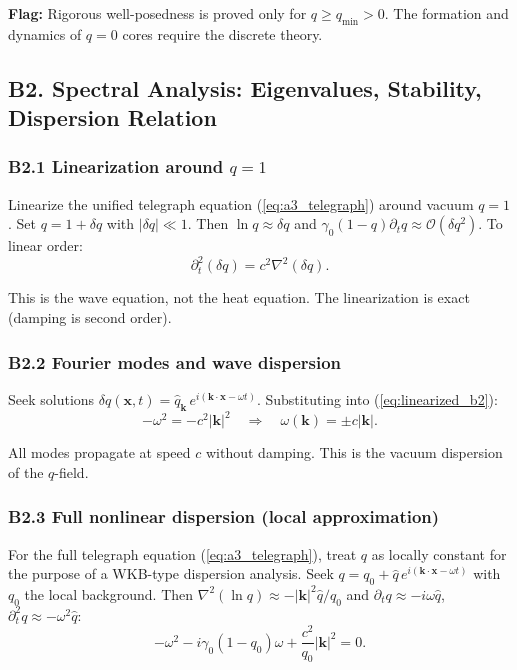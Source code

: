 \documentclass[reprint]{revtex4-2}
\begin{document}
\textbf{Flag:} Rigorous well-posedness is proved only for $q \ge q_{\min} > 0$. The formation and dynamics of $q=0$ cores require the discrete theory.

\subsection{B2. Spectral Analysis: Eigenvalues, Stability, Dispersion Relation}

\subsubsection{B2.1 Linearization around $q=1$}

Linearize the unified telegraph equation (\ref{eq:a3_telegraph}) around vacuum $q=1$. Set $q = 1 + \delta q$ with $|\delta q|\ll 1$. Then $\ln q \approx \delta q$ and $\gamma_0(1-q)\partial_t q \approx \mathcal{O}(\delta q^2)$. To linear order:
\begin{equation}
\partial_t^2(\delta q) = c^2\nabla^2(\delta q).
\label{eq:linearized_b2}
\end{equation}

This is the wave equation, not the heat equation. The linearization is exact (damping is second order).

\subsubsection{B2.2 Fourier modes and wave dispersion}

Seek solutions $\delta q(\mathbf{x},t) = \hat{q}_{\mathbf{k}}\,e^{i(\mathbf{k}\cdot\mathbf{x} - \omega t)}$. Substituting into (\ref{eq:linearized_b2}):
\begin{equation}
-\omega^2 = -c^2|\mathbf{k}|^2 \quad\Longrightarrow\quad \boxed{\omega(\mathbf{k}) = \pm c|\mathbf{k}|}.
\label{eq:wave_dispersion}
\end{equation}

All modes propagate at speed $c$ without damping. This is the vacuum dispersion of the $q$-field.

\subsubsection{B2.3 Full nonlinear dispersion (local approximation)}

For the full telegraph equation (\ref{eq:a3_telegraph}), treat $q$ as locally constant for the purpose of a WKB-type dispersion analysis. Seek $q = q_0 + \hat{q}\,e^{i(\mathbf{k}\cdot\mathbf{x} - \omega t)}$ with $q_0$ the local background. Then $\nabla^2(\ln q) \approx -|\mathbf{k}|^2\hat{q}/q_0$ and $\partial_t q \approx -i\omega\hat{q}$, $\partial_t^2 q \approx -\omega^2\hat{q}$:
\begin{equation}
-\omega^2 - i\gamma_0(1-q_0)\omega + \frac{c^2}{q_0}|\mathbf{k}|^2 = 0.
\end{equation}
\end{document}
